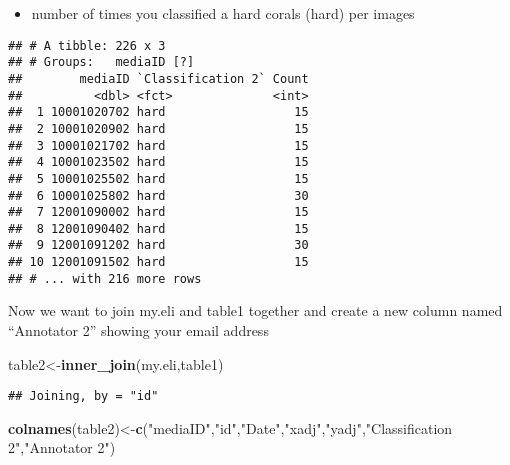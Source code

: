 \documentclass[]{article}
\newenvironment{Shaded}{\begin{snugshade}}{\end{snugshade}}
\newcommand{\KeywordTok}[1]{\textcolor[rgb]{0.13,0.29,0.53}{\textbf{#1}}}
\newcommand{\DataTypeTok}[1]{\textcolor[rgb]{0.13,0.29,0.53}{#1}}
\newcommand{\StringTok}[1]{\textcolor[rgb]{0.31,0.60,0.02}{#1}}
\newcommand{\OperatorTok}[1]{\textcolor[rgb]{0.81,0.36,0.00}{\textbf{#1}}}
\newcommand{\NormalTok}[1]{#1}
\providecommand{\tightlist}{%
  \setlength{\itemsep}{0pt}\setlength{\parskip}{0pt}}
\begin{document}
\begin{itemize}
\tightlist
\item
  number of times you classified a hard corals (hard) per images
\end{itemize}

\begin{Shaded}
\end{Shaded}

\begin{verbatim}
## # A tibble: 226 x 3
## # Groups:   mediaID [?]
##        mediaID `Classification 2` Count
##          <dbl> <fct>              <int>
##  1 10001020702 hard                  15
##  2 10001020902 hard                  15
##  3 10001021702 hard                  15
##  4 10001023502 hard                  15
##  5 10001025502 hard                  15
##  6 10001025802 hard                  30
##  7 12001090002 hard                  15
##  8 12001090402 hard                  15
##  9 12001091202 hard                  30
## 10 12001091502 hard                  15
## # ... with 216 more rows
\end{verbatim}

Now we want to join my.eli and table1 together and create a new column
named ``Annotator 2'' showing your email address

\begin{Shaded}
\begin{Highlighting}[]
\NormalTok{table2<-}\KeywordTok{inner_join}\NormalTok{(my.eli,table1)}
\end{Highlighting}
\end{Shaded}

\begin{verbatim}
## Joining, by = "id"
\end{verbatim}

\begin{Shaded}
\begin{Highlighting}[]
\KeywordTok{colnames}\NormalTok{(table2)<-}\KeywordTok{c}\NormalTok{(}\StringTok{"mediaID"}\NormalTok{,}\StringTok{"id"}\NormalTok{,}\StringTok{"Date"}\NormalTok{,}\StringTok{"xadj"}\NormalTok{,}\StringTok{"yadj"}\NormalTok{,}\StringTok{"Classification 2"}\NormalTok{,}\StringTok{"Annotator 2"}\NormalTok{)}
\end{Highlighting}
\end{Shaded}
\end{document}
